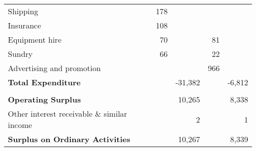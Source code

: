\begin{center}
\begin{tabular}{ l  r  r r r }
Shipping                    & 178    &        &       &   \\
Insurance                   & 108    &        &       &   \\
Equipment hire              & 70     &        & 81    &   \\
Sundry                      & 66     &        & 22    &   \\
Advertising and promotion   &        &        & 966   &   \\
{\bf Total Expenditure}     &        & -31,382 &       & -6,812 \\
\cmidrule(r){2-3} \cmidrule(r){4-5} \\
{\bf Operating Surplus}     &        & 10,265 &       & 8,338 \\
Other interest receivable
\& similar income           &        & 2      &       &   1 \\
{\bf Surplus on Ordinary Activities} & & 10,267 &  & 8,339 \\
\bottomrule
\end{tabular}
\end{center}
\pagebreak
